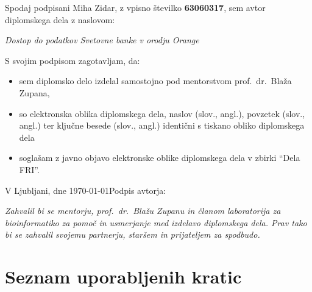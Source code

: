 \documentclass[a4paper, 12pt]{book}
\newcommand{\clearemptydoublepage}{\newpage{\pagestyle{empty}\cleardoublepage}}
\begin{document}
\vspace{1cm}
\noindent Spodaj podpisani Miha Zidar,
z vpisno številko \textbf{63060317}, sem avtor  diplomskega dela z naslovom:
   
\vspace{0.5cm}
\emph{Dostop do podatkov Svetovne banke v orodju Orange}

\vspace{1.5cm}
\noindent S svojim podpisom zagotavljam, da:
\begin{itemize}
    \item sem diplomsko delo izdelal samostojno pod mentorstvom 
        prof.\ dr.\ Blaža Zupana,

    \item so elektronska oblika diplomskega dela, naslov (slov., angl.), povzetek (slov., angl.) ter ključne besede (slov., angl.) identični s tiskano obliko diplomskega dela
    \item soglašam z javno objavo elektronske oblike diplomskega dela v zbirki ``Dela FRI''.
\end{itemize}

\vspace{1cm}
\noindent V Ljubljani, dne \today \hfill Podpis avtorja:

\clearemptydoublepage

\thispagestyle{empty}\mbox{}\vfill\null\it%
Zahvalil bi se mentorju, prof.\ dr.\ Blažu Zupanu in članom laboratorija za 
bioinformatiko za pomoč in usmerjanje med izdelavo diplomskega dela. 
Prav tako bi se zahvalil svojemu partnerju, staršem in prijateljem za
spodbudo.
\rm\normalfont

\clearemptydoublepage

\thispagestyle{empty}\mbox{}{\textheight}\mbox{}\hfill\begin{minipage}{0.55\textwidth}%
\normalfont\end{minipage}
 
\clearemptydoublepage

\def\thepage{}%
\tableofcontents{}


\chapter*{Seznam uporabljenih kratic}
\end{document}
